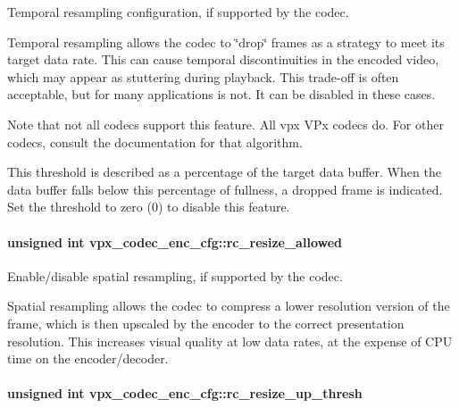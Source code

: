 \-Temporal resampling configuration, if supported by the codec. 

\-Temporal resampling allows the codec to \char`\"{}drop\char`\"{} frames as a strategy to meet its target data rate. \-This can cause temporal discontinuities in the encoded video, which may appear as stuttering during playback. \-This trade-\/off is often acceptable, but for many applications is not. \-It can be disabled in these cases.

\-Note that not all codecs support this feature. \-All vpx \-V\-Px codecs do. \-For other codecs, consult the documentation for that algorithm.

\-This threshold is described as a percentage of the target data buffer. \-When the data buffer falls below this percentage of fullness, a dropped frame is indicated. \-Set the threshold to zero (0) to disable this feature. \hypertarget{structvpx__codec__enc__cfg_a02a4e2f18fb0fdfff44df8b0d9a99d6c}{
\paragraph[{rc\-\_\-resize\-\_\-allowed}]{\setlength{\rightskip}{0pt plus 5cm}unsigned int {\bf vpx\-\_\-codec\-\_\-enc\-\_\-cfg\-::rc\-\_\-resize\-\_\-allowed}}}
\label{structvpx__codec__enc__cfg_a02a4e2f18fb0fdfff44df8b0d9a99d6c}


\-Enable/disable spatial resampling, if supported by the codec. 

\-Spatial resampling allows the codec to compress a lower resolution version of the frame, which is then upscaled by the encoder to the correct presentation resolution. \-This increases visual quality at low data rates, at the expense of \-C\-P\-U time on the encoder/decoder. \hypertarget{structvpx__codec__enc__cfg_a855599c0660f31dfcab4a64996b4f6ad}{
\paragraph[{rc\-\_\-resize\-\_\-up\-\_\-thresh}]{\setlength{\rightskip}{0pt plus 5cm}unsigned int {\bf vpx\-\_\-codec\-\_\-enc\-\_\-cfg\-::rc\-\_\-resize\-\_\-up\-\_\-thresh}}}
\label{structvpx__codec__enc__cfg_a855599c0660f31dfcab4a64996b4f6ad}



